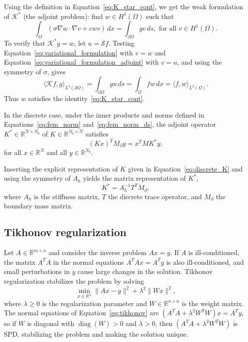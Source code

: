 Using the definition in Equation~\eqref{eq:K_star_cont}, we get the weak formulation of $\mathcal{K}^*$ (the adjoint problem): find $w \in H^1(\Omega)$ such that
\begin{equation}\label{eq:variational_formulation_adjoint}
    \int_\Omega (\sigma \nabla w \cdot \nabla v + c w v) \, dx =
    \int_{\partial\Omega} g v \, ds,
    \text{ for all } v \in H^1(\Omega).
\end{equation}
To verify that $\mathcal K^* g = w$, let $u = \mathcal S f$. Testing Equation~\eqref{eq:variational_formulation} with $v = w$ and Equation~\eqref{eq:variational_formulation_adjoint} with $v = u$, and using the symmetry of $\sigma$, gives
\begin{equation*}
    \langle \mathcal K f, g \rangle_{L^2(\partial\Omega)}
    = \int_{\partial\Omega} g u \, ds
    = \int_\Omega f w \, dx
    = \langle f, w \rangle_{L^2(\Omega)}.
\end{equation*}
Thus $w$ satisfies the identity~\eqref{eq:K_star_cont}.

In the discrete case, under the inner products and norms defined in Equations~\eqref{eq:fem_norm} and~\eqref{eq:fem_norm_ds}, the adjoint operator $K^* \in \mathbb{R}^{N \times N_b}$ of $K \in \mathbb{R}^{N_b \times N}$ satisfies
\begin{equation}\label{eq:K_star_def}
    (K x)^T M_\partial y = x^T M K^* y,
\end{equation}
for all $x \in \mathbb R^N$ and all $y \in \mathbb R^{N_b}$.

Inserting the explicit representation of $K$ given in Equation~\eqref{eq:discrete_K} and using the symmetry of $A_h$ yields the matrix representation of $K^*$,
\begin{equation}\label{eq:discrete_K_star}
    K^* = A_h^{-1} T^T M_\partial,
\end{equation}
where $A_h$ is the stiffness matrix, $T$ the discrete trace operator, and $M_\partial$ the boundary mass matrix.


\subsection{Tikhonov regularization}
Let $A \in \mathbb{R}^{m \times n}$ and consider the inverse problem $Ax = y$. If $A$ is ill-conditioned, the matrix $A^T A$ in the normal equations $A^T A x = A^T y$ is also ill-conditioned, and small perturbations in $y$ 
cause large changes in the solution. Tikhonov regularization stabilizes the problem by solving
\begin{equation}\label{eq:tikhonov}
    \min_{x \in \mathbb{R}^n}
    \|Ax - y\|^2 + \lambda^2 \|Wx\|^2,
\end{equation}
where $\lambda \ge 0$ is the regularization parameter and $W \in \mathbb{R}^{n \times n}$ is the weight matrix. The normal equations of Equation~\eqref{eq:tikhonov} are $(A^T A + \lambda^2 W^T W) x = A^T y$, so if $W$ is diagonal with $\operatorname{diag}(W) > 0$ and $\lambda > 0$, then $(A^T A + \lambda^2 W^T W)$ is SPD, stabilizing the problem and making the solution unique.

